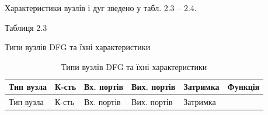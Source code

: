 \documentclass[
]{article}
\begin{document}
Характеристики вузлів і дуг зведено у табл. 2.3 -- 2.4.

Таблиця 2.3

Типи вузлів DFG та їхні характеристики

\begin{longtable}[]{@{}
  >{\raggedright\arraybackslash}p{}
  >{\raggedright\arraybackslash}p{}
  >{\raggedright\arraybackslash}p{}
  >{\raggedright\arraybackslash}p{}
  >{\raggedright\arraybackslash}p{}
  >{\raggedright\arraybackslash}p{}@{}}
\caption[Типи вузлів DFG та їхні характеристики]{Типи вузлів DFG та їхні
характеристики}\tabularnewline
\toprule\noalign{}
\begin{minipage}[b]{\linewidth}\raggedright
Тип вузла
\end{minipage} & \begin{minipage}[b]{\linewidth}\raggedright
К-сть
\end{minipage} & \begin{minipage}[b]{\linewidth}\raggedright
Вх. портів
\end{minipage} & \begin{minipage}[b]{\linewidth}\raggedright
Вих. портів
\end{minipage} & \begin{minipage}[b]{\linewidth}\raggedright
Затримка
\end{minipage} & \begin{minipage}[b]{\linewidth}\raggedright
Функція
\end{minipage} \\
\midrule\noalign{}
\endfirsthead
\toprule\noalign{}
\begin{minipage}[b]{\linewidth}\raggedright
Тип вузла
\end{minipage} & \begin{minipage}[b]{\linewidth}\raggedright
К-сть
\end{minipage} & \begin{minipage}[b]{\linewidth}\raggedright
Вх. портів
\end{minipage} & \begin{minipage}[b]{\linewidth}\raggedright
Вих. портів
\end{minipage} & \begin{minipage}[b]{\linewidth}\raggedright
Затримка
\end{minipage} & \begin{minipage}[b]{\linewidth}\raggedright

\end{minipage}
\end{longtable}
\end{document}
